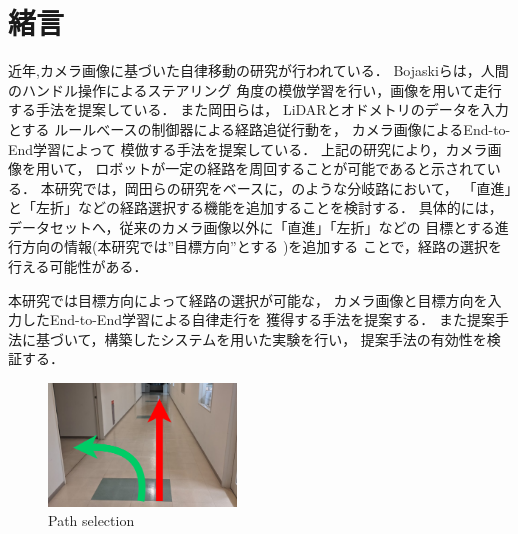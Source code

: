\documentclass[10pt]{jarticle}
\begin{document}
    \section{緒\hspace{2zw}言}%
    近年,カメラ画像に基づいた自律移動の研究が行われている．%
    Bojaskiら\cite{nvidia}は，人間のハンドル操作によるステアリング
    角度の模倣学習を行い，画像を用いて走行する手法を提案している．
    また岡田ら\cite{okada}は，
    LiDARとオドメトリのデータを入力とする
    ルールべースの制御器による経路追従行動を，
    カメラ画像によるEnd-to-End学習によって
    模倣する手法を提案している．
    上記の研究により，カメラ画像を用いて，
    ロボットが一定の経路を周回することが可能であると示されている．
    本研究では，岡田らの研究をベースに，のような分岐路において，
    「直進」と「左折」などの経路選択する機能を追加することを検討する．
    具体的には，データセットへ，従来のカメラ画像以外に「直進」「左折」などの
    目標とする進行方向の情報(本研究では”目標方向”とする )を追加する
    ことで，経路の選択を行える可能性がある．

    本研究では目標方向によって経路の選択が可能な，
    カメラ画像と目標方向を入力したEnd-to-End学習による自律走行を
    獲得する手法を提案する．
    また提案手法に基づいて，構築したシステムを用いた実験を行い，
    提案手法の有効性を検証する．
    \begin{center}
        \begin{figure}[h]
            \centering
            \includegraphics[width=5cm]{./fig/zyuzibunki.png}
            \caption{Path selection}
            \label{fig:bunki}
        \end{figure}
    \end{center}
\end{document}
